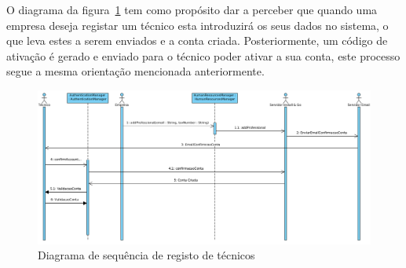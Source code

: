O diagrama da figura~\ref{fig:45} tem como propósito dar a perceber que quando uma empresa deseja registar um técnico esta introduzirá os seus dados no sistema, o que leva estes a serem enviados e a conta criada. Posteriormente, um código de ativação é gerado e enviado para o técnico poder ativar a sua conta, este processo segue a mesma orientação mencionada anteriormente.

\begin{figure}[htb]
    \centering
    \includegraphics[width=\textwidth]{images/diagramas/sequencia/registo_tecnico.png}
    \caption{Diagrama de sequência de registo de técnicos}
    \label{fig:45}
\end{figure}